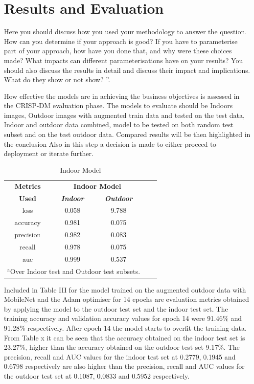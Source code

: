 \documentclass[conference]{IEEEtran}
\begin{document}
\section{Results and Evaluation}
Here you should discuss how you used your methodology to answer the question.  How can you determine if your approach is good?  If you have to parameterise part of your approach, how have you done that, and why were these choices made?  What impacts can different parameterisations have  on  your  results?   You  should  also  discuss  the  results  in  detail  and discuss their impact and implications.  What do they show or not show? ”. \

How effective the models are in achieving the business objectives is assessed in the CRISP-DM evaluation phase. The models to evaluate should be Indoors images, Outdoor images with augmented train data and tested on the test data, Indoor and outdoor data combined, model to be tested on both random test subset and on the test outdoor data. Compared results will be then highlighted in the conclusion 
Also in this step a decision is made to either proceed to deployment or iterate further.  

\begin{table}[htbp]
\caption{Indoor Model}
\begin{center}
\begin{tabular}{|c|c|c|c|c|}
\hline
\textbf{Metrics}&\multicolumn{2}{|c|}{\textbf{Indoor Model}} \\
\cline{2-3} 
\textbf{Used} & \textbf{\textit{Indoor}}& \textbf{\textit{Outdoor}} \\
\hline
loss &0.058&9.788  \\
\hline
accuracy &0.981&0.075 \\
\hline
precision &0.982&0.083 \\
\hline
recall &0.978&0.075 \\
\hline
auc &0.999&0.537  \\
\hline
\multicolumn{3}{l}{$^{\mathrm{a}}$Over Indoor test and Outdoor test subsets.}
\end{tabular}
\label{tab1}
\end{center}
\end{table}

Included in Table III for the model trained on the augmented outdoor data with MobileNet and the Adam optimiser for 14 epochs are evaluation metrics obtained by applying the model to the outdoor test set and the indoor test set. The training accuracy and validation accuracy values for epoch 14 were 91.46\% and 91.28\% respectively. After epoch 14 the model starts to overfit the training data. From Table x it can be seen that the accuracy obtained on the indoor test set is 23.27\%, higher than the accuracy obtained on the outdoor test set 9.17\%. The precision, recall and AUC values for the indoor test set at 0.2779, 0.1945 and 0.6798 respectively are also higher than the precision, recall and AUC values for the outdoor test set at  0.1087, 0.0833 and 0.5952 respectively. 
\end{document}
